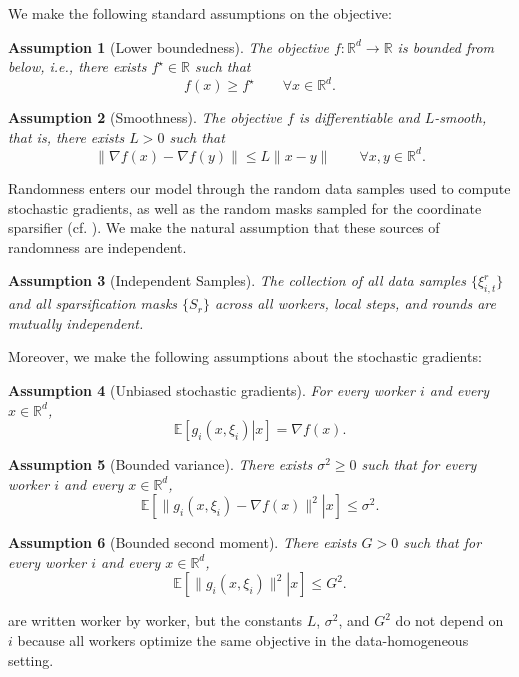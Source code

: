 \documentclass{article}
\newcommand{\R}{\mathbb{R}}  %
\newcommand{\ExpCond}[2]{{\mathbb{E}}\left[\left.#1\right\vert#2\right]}
\theoremstyle{plain}
\newtheorem{assumption}{Assumption}\numberwithin{assumption}{section}
\theoremstyle{definition}
\begin{document}
We make the following standard assumptions on the objective:
\begin{assumption}[Lower boundedness]\label{ass:lower_bounded}
    The objective $f:\R^d \to \R$ is bounded from below, i.e.,
    there exists $f^\star \in \R$ such that
    \[%
        f(x) \ge f^\star \qquad \forall x \in \R^d.
    \]
\end{assumption}
% 
\begin{assumption}[Smoothness]\label{ass:smoothness}
    The objective $f$ is differentiable and $L$-smooth, that is,
    there exists $L>0$ such that
    \[%
        \|\nabla f(x)-\nabla f(y)\| \leq L\|x-y\|
        \qquad \forall x,y \in \R^d.
    \]
\end{assumption}
% 
Randomness enters our model through the random data samples used to compute stochastic gradients, as well as the random masks sampled for the coordinate sparsifier (cf. ).
We make the natural assumption that these sources of randomness are independent.
\begin{assumption}[Independent Samples]\label{ass:independence}
    The collection of all data samples $\{\xi_{i,t}^r\}$ and all sparsification masks $\{S_r\}$ across all workers, local steps, and rounds are mutually independent.
\end{assumption}
%
Moreover, we make the following assumptions about the stochastic gradients:
\begin{assumption}[Unbiased stochastic gradients]\label{ass:unbiased}
    For every worker $i$ and every $x \in \R^d$,
    \[%
        \ExpCond{g_i(x,\xi_i)}{x} = \nabla f(x).
    \]
\end{assumption}
% 
\begin{assumption}[Bounded variance]\label{ass:bounded_variance}
    There exists $\sigma^2 \ge 0$ such that for every worker $i$ and every $x \in \R^d$,
    \[%
        \ExpCond{\|g_i(x,\xi_i)-\nabla f(x) \|^2}{x} \leq \sigma^2.
    \]
\end{assumption}
% 
\begin{assumption}[Bounded second moment]\label{ass:bounded_second_moment}
    There exists $G>0$ such that for every worker $i$ and every $x \in \R^d$,
    \[%
        \ExpCond{ \|g_i(x,\xi_i)\|^2 }{ x } \leq G^2.
    \]
\end{assumption}
% 
 are written worker by worker, but the constants \(L\), \(\sigma^2\), and \(G^2\) do not depend on \(i\) because all workers optimize the same objective in the data-homogeneous setting.
\end{document}

